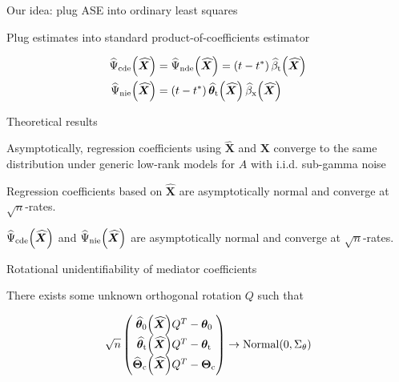 \documentclass{beamer}
\theoremstyle{remark}
\newcommand{\X}{\bm X}
\newcommand{\Xhat}{\widehat{\X}}
\newcommand{\thetazero}{\bm \theta_0}
\newcommand{\thetat}{\bm \theta_\text{t}}
\newcommand{\Thetac}{\bm \Theta_\text{c}}
\newcommand \thetazerohat [1] {\widehat{\bm \theta}_0 \paren*{#1}}
\newcommand \thetathat [1] {\widehat{\bm \theta}_\text{t} \paren*{#1}}
\newcommand \Thetachat [1] {\widehat{\bm \Theta}_\text{c} \paren*{#1}}
\newcommand \betathat [1] {\widehat{\beta}_\text{t} \paren*{#1}}
\newcommand \betaxhat [1] {\widehat{\beta}_\text{x} \paren*{#1}}
\newcommand \cdehat [1] {\widehat{\Psi}_\text{cde} \paren*{#1}}
\newcommand \ndehat [1] {\widehat{\Psi}_\text{nde} \paren*{#1}}
\newcommand \niehat [1] {\widehat{\Psi}_\text{nie} \paren*{#1}}
\DeclarePairedDelimiter{\paren}{(}{)}
\begin{document}
\begin{frame}{Our idea: plug ASE into ordinary least squares}

    Plug estimates into standard product-of-coefficients estimator

    \begin{align*}
        \cdehat{\Xhat} & = \ndehat{\Xhat} = \paren*{t - t^*} \, \betathat{\Xhat}     \\
        \niehat{\Xhat} & = \paren*{t - t^*} \, \thetathat{\Xhat} \, \betaxhat{\Xhat}
    \end{align*}

\end{frame}

\begin{frame}{Theoretical results}
    \begin{theorem}[informal]
        Asymptotically, regression coefficients using $\Xhat$ and $\X$ converge to the same distribution under generic low-rank models for $A$ with i.i.d. sub-gamma noise
    \end{theorem}

    \begin{corollary}[informal]
        Regression coefficients based on $\Xhat$ are asymptotically normal and converge at $\sqrt n$-rates.
    \end{corollary}

    \begin{corollary}[informal]
        $\cdehat{\Xhat}$ and $\niehat{\Xhat}$ are asymptotically normal and converge at $\sqrt n$-rates.
    \end{corollary}
\end{frame}

\begin{frame}{Rotational unidentifiability of mediator coefficients}

    There exists some unknown orthogonal rotation $Q$ such that

    \begin{align*}
        \sqrt n
        \begin{pmatrix}
            \thetazerohat{\Xhat} Q^T - \thetazero \\
            \thetathat{\Xhat} Q^T - \thetat       \\
            \Thetachat{\Xhat} Q^T - \Thetac
        \end{pmatrix}
        \to
        \mathrm{Normal} \paren*{0, \Sigma_\theta}
    \end{align*}
\end{frame}
\end{document}
